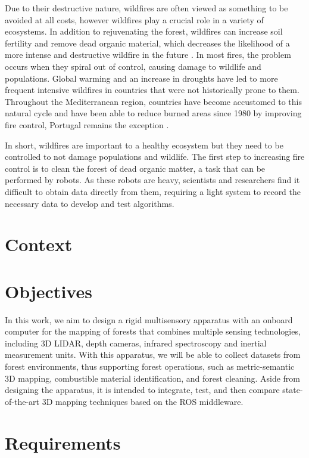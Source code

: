 Due to their destructive nature, wildfires are often viewed as something to be avoided at all costs, however wildfires play a crucial role in a variety of ecosystems. In addition to rejuvenating the forest, wildfires can increase soil fertility and remove dead organic material, which decreases the likelihood of a more intense and destructive wildfire in the future \cite{bond_fires_2017}. In most fires, the problem occurs when they spiral out of control, causing damage to wildlife and populations. Global warming and an increase in droughts have led to more frequent intensive wildfires in countries that were not historically prone to them. Throughout the Mediterranean region, countries have become accustomed to this natural cycle and have been able to reduce burned areas since 1980 by improving fire control, Portugal remains the exception \cite{turco_decreasing_2016}\cite{european_commission_joint_research_centre_forest_2021}.

In short, wildfires are important to a healthy ecosystem but they need to be controlled to not damage populations and wildlife. The first step to increasing fire control is to clean the forest of dead organic matter, a task that can be performed by robots. As these robots are heavy, scientists and researchers find it difficult to obtain data directly from them, requiring a light system to record the necessary data to develop and test algorithms.

\section{Context}

\section{Objectives}
In this work, we aim to design a rigid multisensory apparatus  with an onboard computer for the mapping of forests that combines multiple sensing technologies, including 3D LIDAR, depth cameras, infrared spectroscopy and inertial measurement units. With this apparatus, we will be able to collect datasets from forest environments, thus supporting forest operations, such as metric-semantic 3D mapping, combustible material identification, and forest cleaning. Aside from designing the apparatus, it is intended to integrate, test, and then compare state-of-the-art 3D mapping techniques based on the ROS middleware.

\section{Requirements}